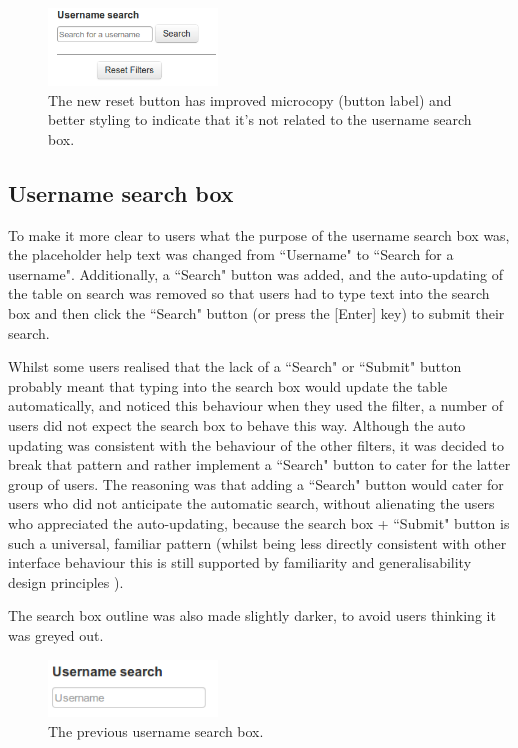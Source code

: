 \begin{figure}[h!]
    \centering
    \includegraphics[width=0.4\textwidth]{Figures/V2/newreset.png}
 \caption{The new reset button has improved microcopy (button label) and better styling to indicate that it's not related to the username search box.}
\end{figure}


\subsection{Username search box}
To make it more clear to users what the purpose of the username search box was, the placeholder help text was changed from ``Username" to ``Search for a username". Additionally, a ``Search" button was added, and the auto-updating of the table on search was removed so that users had to type text into the search box and then click the ``Search" button (or press the [Enter] key) to submit their search. 

Whilst some users realised that the lack of a ``Search" or ``Submit" button probably meant that typing into the search box would update the table automatically, and noticed this behaviour when they used the filter, a number of users did not expect the search box to behave this way. Although the auto updating was consistent with the behaviour of the other filters, it was decided to break that pattern and rather implement a ``Search" button to cater for the latter group of users. The reasoning was that adding a ``Search" button would cater for users who did not anticipate the automatic search, without alienating the users who appreciated the auto-updating, because the search box + ``Submit" button is such a universal, familiar pattern (whilst being less directly consistent with other interface behaviour this is still supported by familiarity and generalisability design principles \citep[p. 264]{DixFinlay}). 

The search box outline was also made slightly darker, to avoid users thinking it was greyed out.

\begin{figure}[h!]
    \centering
    \includegraphics[width=0.4\textwidth]{Figures/V2/usernameold.png}
 \caption{The previous username search box.}
\end{figure}

